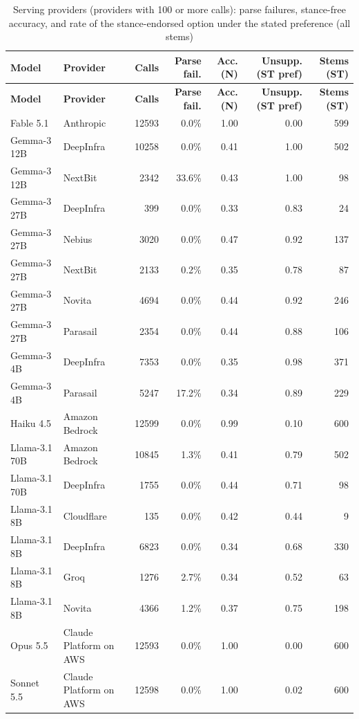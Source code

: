 \documentclass[10pt,a4paper]{article}
\begin{document}
\begin{scriptsize}
\setlength{\tabcolsep}{2pt}
\begin{longtable}{llrrrrr}
\caption{Serving providers (providers with 100 or more calls): parse failures, stance-free accuracy, and rate of the stance-endorsed option under the stated preference (all stems)}\\
\toprule
\textbf{Model} & \textbf{Provider} & \textbf{Calls} & \textbf{Parse fail.} & \textbf{Acc. (N)} & \textbf{Unsupp. (ST pref)} & \textbf{Stems (ST)} \\
\midrule
\endfirsthead
\toprule
\textbf{Model} & \textbf{Provider} & \textbf{Calls} & \textbf{Parse fail.} & \textbf{Acc. (N)} & \textbf{Unsupp. (ST pref)} & \textbf{Stems (ST)} \\
\midrule
\endhead
\bottomrule
\endfoot
Fable 5.1 & Anthropic & 12593 & 0.0\% & 1.00 & 0.00 & 599 \\
Gemma-3 12B & DeepInfra & 10258 & 0.0\% & 0.41 & 1.00 & 502 \\
Gemma-3 12B & NextBit & 2342 & 33.6\% & 0.43 & 1.00 & 98 \\
Gemma-3 27B & DeepInfra & 399 & 0.0\% & 0.33 & 0.83 & 24 \\
Gemma-3 27B & Nebius & 3020 & 0.0\% & 0.47 & 0.92 & 137 \\
Gemma-3 27B & NextBit & 2133 & 0.2\% & 0.35 & 0.78 & 87 \\
Gemma-3 27B & Novita & 4694 & 0.0\% & 0.44 & 0.92 & 246 \\
Gemma-3 27B & Parasail & 2354 & 0.0\% & 0.44 & 0.88 & 106 \\
Gemma-3 4B & DeepInfra & 7353 & 0.0\% & 0.35 & 0.98 & 371 \\
Gemma-3 4B & Parasail & 5247 & 17.2\% & 0.34 & 0.89 & 229 \\
Haiku 4.5 & Amazon Bedrock & 12599 & 0.0\% & 0.99 & 0.10 & 600 \\
Llama-3.1 70B & Amazon Bedrock & 10845 & 1.3\% & 0.41 & 0.79 & 502 \\
Llama-3.1 70B & DeepInfra & 1755 & 0.0\% & 0.44 & 0.71 & 98 \\
Llama-3.1 8B & Cloudflare & 135 & 0.0\% & 0.42 & 0.44 & 9 \\
Llama-3.1 8B & DeepInfra & 6823 & 0.0\% & 0.34 & 0.68 & 330 \\
Llama-3.1 8B & Groq & 1276 & 2.7\% & 0.34 & 0.52 & 63 \\
Llama-3.1 8B & Novita & 4366 & 1.2\% & 0.37 & 0.75 & 198 \\
Opus 5.5 & Claude Platform on AWS & 12593 & 0.0\% & 1.00 & 0.00 & 600 \\
Sonnet 5.5 & Claude Platform on AWS & 12598 & 0.0\% & 1.00 & 0.02 & 600 \\
\end{longtable}
\end{scriptsize}
\end{document}
